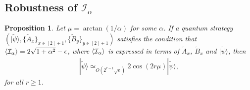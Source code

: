 \documentclass[11pt,letterpaper]{article}
\newcommand{\ket}[1]{|#1\rangle}
\DeclarePairedDelimiter{\ip}{\langle}{\rangle}
\newcommand{\1}{\mathbb{1}}
\newcommand{\tA}{\tilde{A}}
\newcommand{\tB}{\tilde{B}}
\newcommand{\tpsi}{\tilde{\psi}}
\newcommand{\I}{\mathcal{I}}
\newcommand{\appd}[1]{\simeq_{#1}}
\newtheorem{proposition}[theorem]{Proposition}
\theoremstyle{definition}
\begin{document}
\subsection{Robustness of $\I_\alpha$}
\begin{proposition}
\label{prop:2d-subspace}
	Let $\mu = \arctan(1/\alpha)$ for some $\alpha$.
	If a quantum strategy $(\ket{\tpsi}, \{\tilde{A}_x\}_{x \in [2]+1}, \{\tilde{B}_y\}_{y \in [2]+1})$ 
	satisfies the condition that $\ip{\I_\alpha} = 2\sqrt{1+\alpha^2}-\epsilon$, where 
	$\ip{\I_\alpha}$ is expressed in terms of $\tA_x$,  $\tB_x$ and $\ket{\tpsi}$,
	then  
	\begin{align}
		[(\tB_0\tB_1)^r + (\tB_1\tB_0)^r] \ket{\tpsi} \appd{O(2^{r-1}\sqrt{\epsilon})} 2\cos(2r\mu)\ket{\tpsi},
	\end{align}
	for all $r \geq 1$.
\end{proposition}
\end{document}

